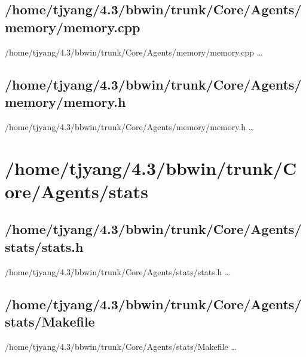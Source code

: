 \subsection{/home/tjyang/4.3/bbwin/trunk/Core/Agents/memory/memory.cpp}
\lstset{numberstyle=\tiny,numbers=left,
   breaklines=true,
   stepnumber=1,numbersep=5pt,firstnumber=1,
   xleftmargin=12pt,showstringspaces=false}
\noindent /home/tjyang/4.3/bbwin/trunk/Core/Agents/memory/memory.cpp  \ldots



\subsection{/home/tjyang/4.3/bbwin/trunk/Core/Agents/memory/memory.h}
\lstset{numberstyle=\tiny,numbers=left,
   breaklines=true,
   stepnumber=1,numbersep=5pt,firstnumber=1,
   xleftmargin=12pt,showstringspaces=false}
\noindent /home/tjyang/4.3/bbwin/trunk/Core/Agents/memory/memory.h  \ldots





\section{/home/tjyang/4.3/bbwin/trunk/Core/Agents/stats}

\subsection{/home/tjyang/4.3/bbwin/trunk/Core/Agents/stats/stats.h}
\lstset{numberstyle=\tiny,numbers=left,
   breaklines=true,
   stepnumber=1,numbersep=5pt,firstnumber=1,
   xleftmargin=12pt,showstringspaces=false}
\noindent /home/tjyang/4.3/bbwin/trunk/Core/Agents/stats/stats.h  \ldots



\subsection{/home/tjyang/4.3/bbwin/trunk/Core/Agents/stats/Makefile}
\lstset{numberstyle=\tiny,numbers=left,
   breaklines=true,
   stepnumber=1,numbersep=5pt,firstnumber=1,
   xleftmargin=12pt,showstringspaces=false}
\noindent /home/tjyang/4.3/bbwin/trunk/Core/Agents/stats/Makefile  \ldots




